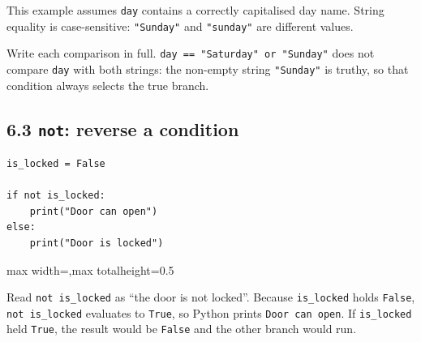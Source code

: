 \documentclass[12pt,a4paper]{article}
\begin{document}
This example assumes \texttt{day} contains a correctly capitalised day name. String equality is case-sensitive: \texttt{"Sunday"} and \texttt{"sunday"} are different values.

Write each comparison in full. \texttt{day == "Saturday" or "Sunday"} does not compare \texttt{day} with both strings: the non-empty string \texttt{"Sunday"} is truthy, so that condition always selects the true branch.

\subsection*{6.3 \texttt{not}: reverse a condition}
\begin{minipage}{\linewidth}
\begin{lstlisting}
is_locked = False

if not is_locked:
    print("Door can open")
else:
    print("Door is locked")
\end{lstlisting}
\end{minipage}
\par
\begin{center}
\begin{adjustbox}{max width=\linewidth,max totalheight=0.5\textheight}
\end{adjustbox}
\end{center}
Read \texttt{not is\_locked} as “the door is not locked”. Because \texttt{is\_locked} holds \texttt{False}, \texttt{not is\_locked} evaluates to \texttt{True}, so Python prints \texttt{Door can open}. If \texttt{is\_locked} held \texttt{True}, the result would be \texttt{False} and the other branch would run.
\end{document}
